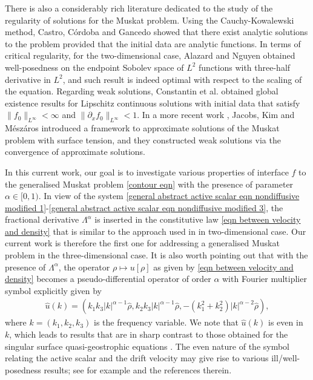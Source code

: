 \documentclass[reqno]{amsart}%
\theoremstyle{definition}
\theoremstyle{remark}
\numberwithin{equation}{section}
\newcommand{\0}{\mathbf{0}}
\newcommand{\1}{\mathbf{1}}
\numberwithin{equation}{section}
\numberwithin{theorem}{section}
\numberwithin{figure}{section}
\begin{document}
There is also a considerably rich literature dedicated to the study of the regularity of solutions for the Muskat problem. Using the Cauchy-Kowalewski method, Castro, C\'ordoba and Gancedo \cite{CCG10} showed that there exist analytic solutions to the problem provided that the initial data are analytic functions. In terms of critical regularity, for the two-dimensional case, Alazard and Nguyen \cite{AN23} obtained well-posedness on the endpoint Sobolev space of $L^2$ functions with three-half derivative in $L^2$, and such result is indeed optimal with respect to the scaling of the equation. Regarding weak solutions, Constantin et al. \cite{CCG13} obtained global existence results for Lipschitz continuous solutions with initial data that satisfy $\|f_0\|_{L^\infty}<\infty$ and $\|\partial_xf_0\|_{L^\infty}<1$. In a more recent work \cite{JKM21}, Jacobs, Kim and M\'{e}sz\'{a}ros introduced a framework to approximate solutions of the Muskat problem with surface tension, and they constructed weak solutions via the convergence of approximate solutions. 

In this current work, our goal is to investigate various properties of interface $f$ to the generalised Muskat problem \eqref{contour eqn} with the presence of parameter $\alpha\in[0,1)$. In view of the system \eqref{general abstract active scalar eqn nondiffusive modified 1}-\eqref{general abstract active scalar eqn nondiffusive modified 3}, the fractional derivative $\Lambda^{\alpha}$ is inserted in the constitutive law \eqref{eqn between velocity and density} that is similar to the approach used in \cite{FGSV12} in two-dimensional case. Our current work is therefore the first one for addressing a generalised Muskat problem in the three-dimensional case. It is also worth pointing out that with the presence of $\Lambda^{\alpha}$, the operator $\rho\mapsto u[\rho]$ as given by \eqref{eqn between velocity and density} becomes a pseudo-differential operator of order $\alpha$ with Fourier multiplier symbol explicitly given by
\begin{align*}
{\hat{u}(k)= \left( k_1k_3|k|^{\alpha-1}\hat{\rho}, k_2k_3|k|^{\alpha-1}\hat{\rho},-(k_1^2+k_2^2)|k|^{\alpha-2}\hat{\rho} \right),}
\end{align*}
where $k=(k_1,k_2,k_3)$ is the frequency variable. We note that $\hat{u}(k)$ is even in $k$, which leads to results that are in sharp contrast to those obtained for the singular surface quasi-geostrophic equations \cite{CCCG12}. The even nature of the symbol relating the active scalar and the drift velocity may give rise to various ill/well-posedness results; see for example \cite{FV11, FS19, FS23, FSW24, Sh11} and the references therein.
\end{document}
